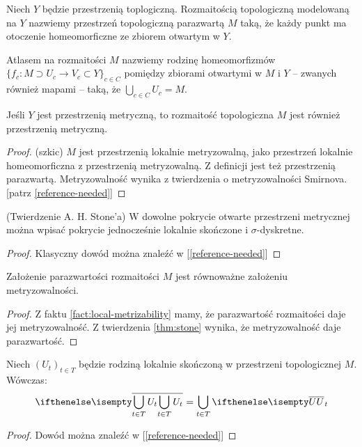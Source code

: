 \begin{df}
  Niech $Y$ będzie przestrzenią toplogiczną. Rozmaitością topologiczną modelowaną na $Y$ nazwiemy przestrzeń topologiczną parazwartą $M$ taką, że każdy punkt ma otoczenie homeomorficzne ze zbiorem otwartym w $Y$.
\end{df}

\begin{df}
  Atlasem na rozmaitości $M$ nazwiemy rodzinę homeomorfizmów $\{f_c : M \supset U_c \to V_c \subset Y\}_{c \in C}$ pomiędzy zbiorami otwartymi w $M$ i $Y$ -- zwanych również mapami -- taką, że $\bigcup_{c \in C} U_c = M$.
\end{df}


\begin{fact} \label{fact:local-metrizability}
  Jeśli $Y$ jest przestrzenią metryczną, to rozmaitość topologiczna $M$ jest również przestrzenią metryczną.
  \begin{proof}(szkic)
    $M$ jest przestrzenią lokalnie metryzowalną, jako przestrzeń lokalnie homeomorficzna z przestrzenią metryzowalną. Z definicji jest też przestrzenią parazwartą. Metryzowalność wynika z twierdzenia o metryzowalności Smirnova. [patrz \ref{reference-needed}]
  \end{proof}
\end{fact}

\begin{thm}(Twierdzenie A. H. Stone'a)
  \label{thm:stone}
  W dowolne pokrycie otwarte przestrzeni metrycznej można wpisać pokrycie jednocześnie lokalnie skończone i $\sigma$-dyskretne.
  \begin{proof}
    Klasyczny dowód można znaleźć w [\ref{reference-needed}]
  \end{proof}
\end{thm}

\begin{cor}
  Założenie parazwartości rozmaitości $M$ jest równoważne założeniu metryzowalności.
  \begin{proof}
    Z faktu \ref{fact:local-metrizability} mamy, że parazwartość rozmaitości daje jej metryzowalność. Z twierdzenia \ref{thm:stone} wynika, że metryzowalność daje parazwartość.
  \end{proof}
\end{cor}

\begin{lem} \label{lem:cl-locally-finite-sum}
  Niech $(U_t)_{t \in T}$ będzie rodziną lokalnie skończoną w przestrzeni topologicznej $M$. Wówczas:
  \[
    \cl{\bigcup_{t \in T} U_t} = \bigcup_{t \in T} \cl U_t
  \]
  \begin{proof}
    Dowód można znaleźć w [\ref{reference-needed}]
  \end{proof}
\end{lem}

